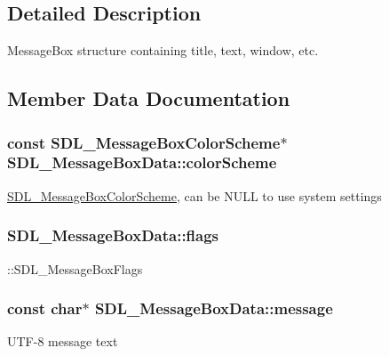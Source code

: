 \subsection{Detailed Description}
Message\+Box structure containing title, text, window, etc. 

\subsection{Member Data Documentation}
\hypertarget{structSDL__MessageBoxData_a18744865a3e89e260db5f01aee579e35}{}
\subsubsection[{color\+Scheme}]{\setlength{\rightskip}{0pt plus 5cm}const {\bf S\+D\+L\+\_\+\+Message\+Box\+Color\+Scheme}$\ast$ S\+D\+L\+\_\+\+Message\+Box\+Data\+::color\+Scheme}\label{structSDL__MessageBoxData_a18744865a3e89e260db5f01aee579e35}
\hyperlink{structSDL__MessageBoxColorScheme}{S\+D\+L\+\_\+\+Message\+Box\+Color\+Scheme}, can be N\+U\+L\+L to use system settings \hypertarget{structSDL__MessageBoxData_a113d016f760bf4e4156b0f376358d6a0}{}
\subsubsection[{flags}]{ S\+D\+L\+\_\+\+Message\+Box\+Data\+::flags}\label{structSDL__MessageBoxData_a113d016f760bf4e4156b0f376358d6a0}
\+::\+S\+D\+L\+\_\+\+Message\+Box\+Flags \hypertarget{structSDL__MessageBoxData_ada6ae208a1f85adabbd7a7a08ca609c8}{}
\subsubsection[{message}]{\setlength{\rightskip}{0pt plus 5cm}const char$\ast$ S\+D\+L\+\_\+\+Message\+Box\+Data\+::message}\label{structSDL__MessageBoxData_ada6ae208a1f85adabbd7a7a08ca609c8}
U\+T\+F-\/8 message text \hypertarget{structSDL__MessageBoxData_a93ceeafeed20b553ad4c86c9be37f117}{}
